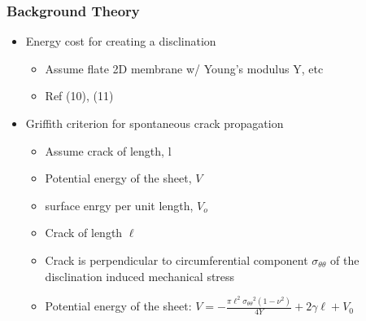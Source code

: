 \documentclass[11pt]{article}
\begin{document}
\subsubsection{Background Theory}
\label{sec-3.1.5}

\begin{itemize}

\item Energy cost for creating a disclination\\
\label{sec-3.1.5.1}

\begin{itemize}

\item Assume flate 2D membrane w/ Young's modulus Y, etc\\
\label{sec-3.1.5.1.1}


\item Ref (10), (11)\\
\label{sec-3.1.5.1.2}

\end{itemize} %

\item Griffith criterion for spontaneous crack propagation\\
\label{sec-3.1.5.2}

\begin{itemize}

\item Assume crack of length, l\\
\label{sec-3.1.5.2.1}


\item Potential energy of the sheet, $V$\\
\label{sec-3.1.5.2.2}


\item surface enrgy per unit length, $V_o$\\
\label{sec-3.1.5.2.3}


\item Crack of length $\ell$\\
\label{sec-3.1.5.2.4}


\item Crack is perpendicular to circumferential component $\sigma_{\theta \theta}$ of the disclination induced mechanical stress\\
\label{sec-3.1.5.2.5}


\item Potential energy of the sheet: $V =-\frac{\pi \ell^2 {\sigma_{\theta \theta}}^2 (1-\nu^2)}{4 Y} + 2 \gamma \ell + V_0$\\
\label{sec-3.1.5.2.6}



\end{itemize}
\end{itemize}
\end{document}
